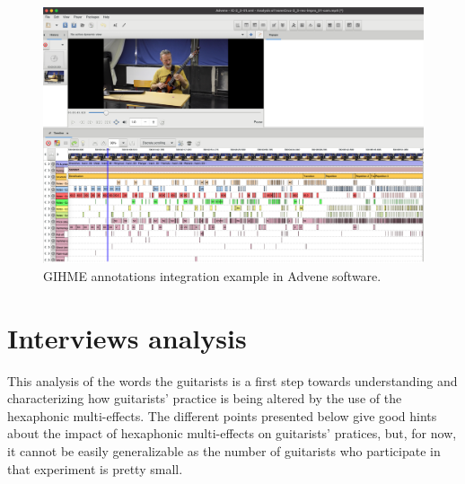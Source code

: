 \documentclass{article}
\begin{document}
\begin{figure}
    \centering
    \includegraphics[width=\columnwidth]{figures/IvannCruz_2_3_1_Advene.png}
    \caption{GIHME annotations integration example in Advene software.}
    \label{fig:Ivann-2_4-advene}
\end{figure}


    
    


\section{Interviews analysis}
\label{sec:analysis}

This analysis of the words the guitarists is a first step towards understanding and characterizing how guitarists' practice is being altered by the use of the hexaphonic multi-effects.  
The different points presented below give good hints about the impact of hexaphonic multi-effects on guitarists' pratices, but, for now, it cannot be easily generalizable as the number of guitarists who participate in that experiment is pretty small.
\end{document}
